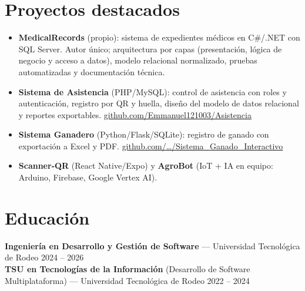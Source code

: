 \documentclass[11pt,a4paper]{article}
\begin{document}
\section{Proyectos destacados}
\begin{itemize}
  \item \textbf{MedicalRecords} (propio): sistema de expedientes médicos en C\#/.NET con SQL Server. Autor único;
        arquitectura por capas (presentación, lógica de negocio y acceso a datos), modelo relacional normalizado,
        pruebas automatizadas y documentación técnica.
  \item \textbf{Sistema de Asistencia} (PHP/MySQL): control de asistencia con roles y autenticación, registro por QR y
        huella, diseño del modelo de datos relacional y reportes exportables.
        \href{https://github.com/Emmanuel121003/Asistencia}{github.com/Emmanuel121003/Asistencia}
  \item \textbf{Sistema Ganadero} (Python/Flask/SQLite): registro de ganado con exportación a Excel y PDF.
        \href{https://github.com/Emmanuel121003/Sistema_Ganado_Interactivo}{github.com/…/Sistema\_Ganado\_Interactivo}
  \item \textbf{Scanner-QR} (React Native/Expo) y \textbf{AgroBot} (IoT + IA en equipo: Arduino, Firebase, Google Vertex AI).
\end{itemize}

\section{Educación}
\textbf{Ingeniería en Desarrollo y Gestión de Software} --- Universidad Tecnológica de Rodeo \hfill {\color{muted}\small 2024 -- 2026}\\[3pt]
\textbf{TSU en Tecnologías de la Información} (Desarrollo de Software Multiplataforma) --- Universidad Tecnológica de Rodeo \hfill {\color{muted}\small 2022 -- 2024}

\end{document}
